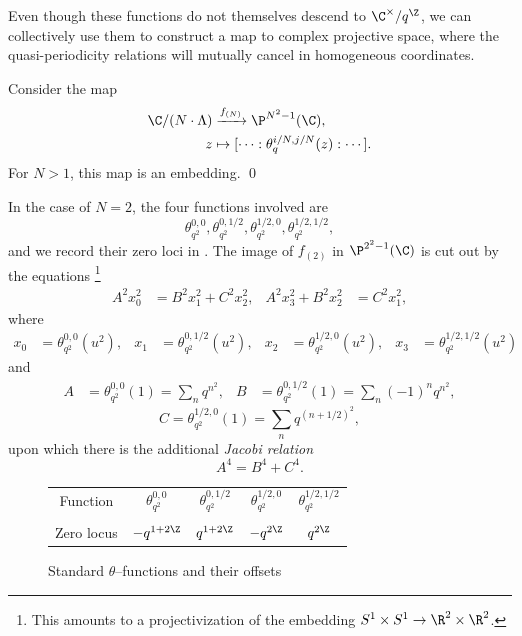 Even though these functions do not themselves descend to \(\C^\times / q^{\Z}\), we can collectively use them to construct a map to complex projective space, where the quasi-periodicity relations will mutually cancel in homogeneous coordinates.
\begin{theorem}
Consider the map
\begin{align*}
\C / (N \cdot \Lambda) & \xrightarrow{f_{(N)}} \P^{N^2-1}(\C), \\
z & \mapsto [\cdots : \theta_q^{i/N, j/N}(z) : \cdots].
\end{align*}
For \(N > 1\), this map is an embedding. \qed
\end{theorem}

\begin{example}
In the case of \(N = 2\), the four functions involved are \[\theta_{q^2}^{0,0}, \theta_{q^2}^{0,1/2}, \theta_{q^2}^{1/2,0}, \theta_{q^2}^{1/2,1/2},\] and we record their zero loci in .
The image of \(f_{(2)}\) in \(\P^{2^2 - 1}(\C)\) is cut out by the equations%
\footnote{%
This amounts to a projectivization of the embedding \(S^1 \times S^1 \to \R^2 \times \R^2\).
}
\begin{align*}
A^2 x_0^2 & = B^2 x_1^2 + C^2 x_2^2, &
A^2 x_3^2 + B^2 x_2^2 & = C^2 x_1^2,
\end{align*}
where
\begin{align*}
x_0 & = \theta_{q^2}^{0, 0}(u^2), &
x_1 & = \theta_{q^2}^{0, 1/2}(u^2), &
x_2 & = \theta_{q^2}^{1/2, 0}(u^2), &
x_3 & = \theta_{q^2}^{1/2, 1/2}(u^2)
\end{align*}
and
\begin{align*}
A & = \theta_{q^2}^{0, 0}(1) = \sum_n q^{n^2}, &
B & = \theta_{q^2}^{0, 1/2}(1) = \sum_n (-1)^n q^{n^2},
\end{align*}
\[C = \theta_{q^2}^{1/2, 0}(1) = \sum_n q^{(n + 1/2)^2},\]
upon which there is the additional \textit{Jacobi relation} \[A^4 = B^4 + C^4.\]
\end{example}

\begin{figure}
\begin{center}
\begin{tabular}{@{}ccccc@{}} \toprule
Function & \(\theta_{q^2}^{0,0}\) & \(\theta_{q^2}^{0,1/2}\) & \(\theta_{q^2}^{1/2,0}\) & \(\theta_{q^2}^{1/2,1/2}\) \\ \\
Zero locus & \(-q^{1+2\Z}\) & \(q^{1+2\Z}\) & \(-q^{2\Z}\) & \(q^{2\Z}\) \\
\bottomrule
\end{tabular}
\end{center}
\caption{Standard \(\theta\)--functions and their offsets}\label{ThetaFunctionsTable}
\end{figure}

